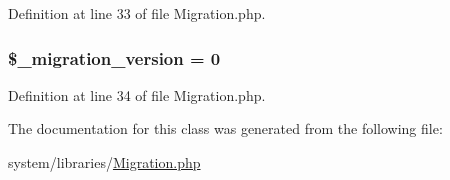 Definition at line 33 of file Migration.\-php.

\hypertarget{class_c_i___migration_a6bffbb1001557bd7ffb22183b51f589d}{
\subsubsection[{\$\-\_\-migration\-\_\-version}]{\setlength{\rightskip}{0pt plus 5cm}\$\-\_\-migration\-\_\-version = 0\hspace{0.3cm}{\ttfamily [protected]}}}\label{class_c_i___migration_a6bffbb1001557bd7ffb22183b51f589d}


Definition at line 34 of file Migration.\-php.



The documentation for this class was generated from the following file\-:\begin{DoxyCompactItemize}
\item 
system/libraries/\hyperlink{system_2libraries_2migration_8php}{Migration.\-php}\end{DoxyCompactItemize}
